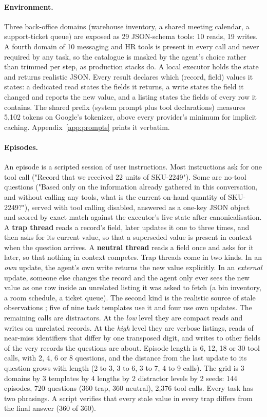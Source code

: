 \paragraph{Environment.} Three back-office domains (warehouse inventory, a shared meeting calendar, a support-ticket queue) are exposed as 29 JSON-schema tools: 10 reads, 19 writes. A fourth domain of 10 messaging and HR tools is present in every call and never required by any task, so the catalogue is masked by the agent's choice rather than trimmed per step, as production stacks do. A local executor holds the state and returns realistic JSON. Every result declares which (record, field) values it states: a dedicated read states the fields it returns, a write states the field it changed and reports the new value, and a listing states the fields of every row it contains. The shared prefix (system prompt plus tool declarations) measures 5,102 tokens on Google's tokenizer, above every provider's minimum for implicit caching. Appendix~\ref{app:prompts} prints it verbatim.

\paragraph{Episodes.} An episode is a scripted session of user instructions. Most instructions ask for one tool call ("Record that we received 22 units of SKU-2249"). Some are no-tool questions ("Based only on the information already gathered in this conversation, and without calling any tools, what is the current on-hand quantity of SKU-2249?"), served with tool calling disabled, answered as a one-key JSON object and scored by exact match against the executor's live state after canonicalisation. A \textbf{trap thread} reads a record's field, later updates it one to three times, and then asks for its current value, so that a superseded value is present in context when the question arrives. A \textbf{neutral thread} reads a field once and asks for it later, so that nothing in context competes. Trap threads come in two kinds. In an \emph{own} update, the agent's own write returns the new value explicitly. In an \emph{external} update, someone else changes the record and the agent only ever sees the new value as one row inside an unrelated listing it was asked to fetch (a bin inventory, a room schedule, a ticket queue). The second kind is the realistic source of stale observations \citep{a2610_05281}; five of nine task templates use it and four use own updates. The remaining calls are distractors. At the \emph{low} level they are compact reads and writes on unrelated records. At the \emph{high} level they are verbose listings, reads of near-miss identifiers that differ by one transposed digit, and writes to other fields of the very records the questions are about. Episode length is 6, 12, 18 or 30 tool calls, with 2, 4, 6 or 8 questions, and the distance from the last update to its question grows with length (2 to 3, 3 to 6, 3 to 7, 4 to 9 calls). The grid is 3 domains by 3 templates by 4 lengths by 2 distractor levels by 2 seeds: 144 episodes, 720 questions (360 trap, 360 neutral), 2,376 tool calls. Every task has two phrasings. A script verifies that every stale value in every trap differs from the final answer (360 of 360).

